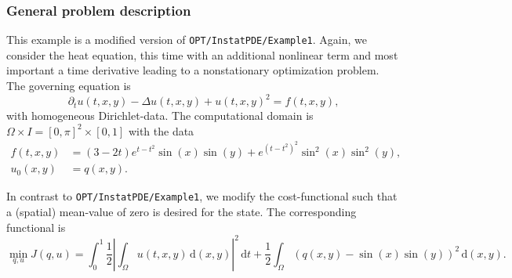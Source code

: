 \subsubsection{General problem description}

This example is a modified version of \texttt{OPT/InstatPDE/Example1}. 
Again, we consider the heat equation, this time with an additional nonlinear
term and most important a time derivative leading to a 
nonstationary optimization problem. The governing equation is
\begin{equation*}
\partial_t u(t,x,y) - \Delta u(t,x,y) + u(t,x,y)^2 = f(t,x,y),
\end{equation*}
with homogeneous Dirichlet-data.
The computational domain is $\Omega \times I = [0,\pi]^2 \times [0,1]$ with the data
\begin{align*}
f(t,x,y) &= (3-2t)e^{t-t^2} \sin(x) \sin(y) + e^{(t-t^2)^2} \sin^2(x) \sin^2(y),\\
u_0(x,y) &= q(x,y).
\end{align*}

In contrast to \texttt{OPT/InstatPDE/Example1}, we modify the cost-functional
such that a (spatial) mean-value of zero is desired for the state.
The corresponding functional is
\[
 \min_{q,u} J(q,u) = \int_0^1 \frac{1}{2}\left|\int_{\Omega} u(t,x,y) \,\mathrm{d}(x,y)\right|^2 \,\mathrm{d}t + \frac{1}{2} \int_{\Omega} (q(x,y) - \sin(x) \sin(y))^2\,\mathrm{d}(x,y).
\]

